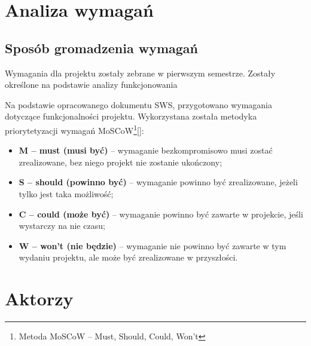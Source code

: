 
\chapter{Analiza wymagań}
\label{ch:analiza-wymagan}

\section{Sposób gromadzenia wymagań}
\label{sec:sposob-gromadzenia-wymagan}

Wymagania dla projektu zostały zebrane w pierwszym semestrze. Zostały określone na podstawie analizy funkcjonowania

Na podstawie opracowanego dokumentu SWS, przygotowano wymagania dotyczące funkcjonalności projektu. Wykorzystana została metodyka priorytetyzacji wymagań MoSCoW\footnote{Metoda MoSCoW – Must, Should, Could, Won't}[]:
\begin{itemize}
    \item \textbf{M – must (musi być)} – wymaganie bezkompromisowo musi zostać zrealizowane, bez niego projekt nie zostanie ukończony;
    \item \textbf{S – should (powinno być)} – wymaganie powinno być zrealizowane, jeżeli tylko jest taka możliwość;
    \item \textbf{C – could (może być)} – wymaganie powinno być zawarte w projekcie, jeśli wystarczy na nie czasu;
    \item \textbf{W – won't (nie będzie)} – wymaganie nie powinno być zawarte w tym wydaniu projektu, ale może być zrealizowane w przyszłości.
\end{itemize}


\chapter{Aktorzy}
\label{sec:aktorzy}

\begin{stakeholder}[label={tab:stakeholder:someholder},caption={opis udzialowca}]
    \requ{-----------------}
\end{stakeholder}

